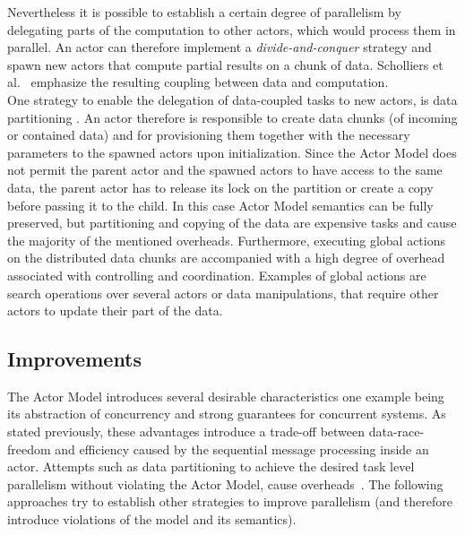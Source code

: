 \documentclass[11pt, journal]{IEEEtran}
\begin{document}
Nevertheless it is possible to establish a certain degree of parallelism by delegating parts of the computation to other actors, which would process them in parallel. An actor can therefore implement a \textit{divide-and-conquer} strategy and spawn new actors that compute partial results on a chunk of data. Scholliers et al.~\cite{Scholliers2010a} emphasize the resulting coupling between data and computation.\\
One strategy to enable the delegation of data-coupled tasks to new actors, is data partitioning \cite{Diaconescu02a}. An actor therefore is responsible to create data chunks (of incoming or contained data) and for provisioning them together with the necessary parameters to the spawned actors upon initialization. Since the Actor Model does not permit the parent actor and the spawned actors to have access to the same data, the parent actor has to release its lock on the partition or create a copy before passing it to the child. In this case Actor Model semantics can be fully preserved, but partitioning and copying of the data are expensive tasks and cause the majority of the mentioned overheads. Furthermore, executing global actions on the distributed data chunks are accompanied with a high degree of overhead associated with controlling and coordination. Examples of global actions are search operations over several actors or data manipulations, that require other actors to update their part of the data.

\subsection{Improvements}\label{subsec:improvements}
The Actor Model introduces several desirable characteristics one example being its abstraction of concurrency and strong guarantees for concurrent systems. As stated previously, these advantages introduce a trade-off between data-race-freedom and efficiency caused by the sequential message processing inside an actor. Attempts such as data partitioning to achieve the desired task level parallelism without violating the Actor Model, cause overheads~\cite{Scholliers2010a}. The following approaches try to establish other strategies to improve parallelism (and therefore introduce violations of the model and its semantics). 
\end{document}
